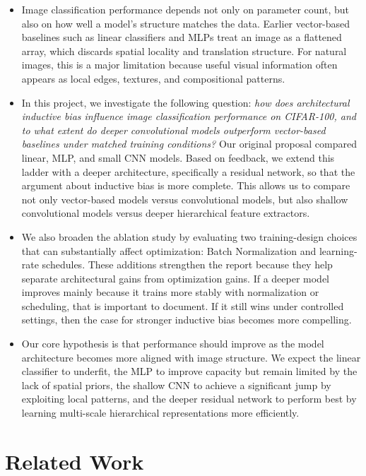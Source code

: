 \documentclass{article}
\begin{document}
\begin{itemize}
    \item Image classification performance depends not only on parameter count, but also on how well a model's structure matches the data. Earlier vector-based baselines such as linear classifiers and MLPs treat an image as a flattened array, which discards spatial locality and translation structure. For natural images, this is a major limitation because useful visual information often appears as local edges, textures, and compositional patterns.

    \item In this project, we investigate the following question: \textit{how does architectural inductive bias influence image classification performance on CIFAR-100, and to what extent do deeper convolutional models outperform vector-based baselines under matched training conditions?} Our original proposal compared linear, MLP, and small CNN models. Based on feedback, we extend this ladder with a deeper architecture, specifically a residual network, so that the argument about inductive bias is more complete. This allows us to compare not only vector-based models versus convolutional models, but also shallow convolutional models versus deeper hierarchical feature extractors.

    \item We also broaden the ablation study by evaluating two training-design choices that can substantially affect optimization: Batch Normalization and learning-rate schedules. These additions strengthen the report because they help separate architectural gains from optimization gains. If a deeper model improves mainly because it trains more stably with normalization or scheduling, that is important to document. If it still wins under controlled settings, then the case for stronger inductive bias becomes more compelling.

    \item Our core hypothesis is that performance should improve as the model architecture becomes more aligned with image structure. We expect the linear classifier to underfit, the MLP to improve capacity but remain limited by the lack of spatial priors, the shallow CNN to achieve a significant jump by exploiting local patterns, and the deeper residual network to perform best by learning multi-scale hierarchical representations more efficiently.
\end{itemize}

\section{Related Work}
\end{document}
